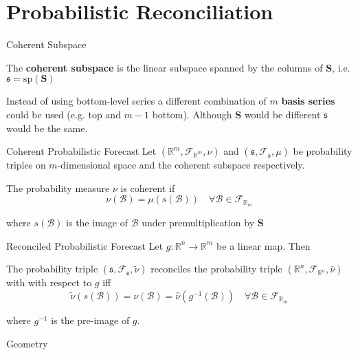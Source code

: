 \documentclass{beamer}
\begin{document}
  \section{Probabilistic Reconciliation}
  \begin{frame}{Coherent Subspace}
  	\begin{definition} 
  		The {\bf coherent subspace} is the linear subspace spanned by the columns of ${\bm S}$, i.e. $\mathfrak{s}=\mbox{sp}({\bm S})$
  	\end{definition}
    Instead of using bottom-level series a different combination of $m$ {\bf basis series} could be used (e.g. top and $m-1$ bottom).  Although ${\bm S}$ would be different $\mathfrak{s}$ would be the same.
  \end{frame}
  \begin{frame}{Coherent Probabilistic Forecast}
    Let $(\mathbb{R}^m,\mathcal{F}_{\mathbb{R}^m},\nu)$ and $(\mathfrak{s},\mathcal{F}_{\mathfrak{s}},\mu)$ be probability triples on $m$-dimensional space and the coherent subspace respectively.
    \begin{definition}
      The probability measure $\nu$ is coherent if
      \begin{equation*}
      \nu(\mathcal{B})=\mu(s(\mathcal{B}))\quad\forall\mathcal{B}\in \mathcal{F}_{\mathbb{R}_m}
      \end{equation*} 
    \end{definition}
    where $s(\mathcal{B})$ is the image of $\mathcal{B}$ under premultiplication by ${\bm S}$
  \end{frame}
  \begin{frame}{Reconciled Probabilistic Forecast}
  	Let $g:\mathbb{R}^n\rightarrow\mathbb{R}^m$ be a linear map.  Then 
  	\begin{definition}
  	The probability triple $\left(\mathfrak{s},\mathcal{F}_{\mathfrak{s}},\tilde{\nu}\right)$ reconciles the probability triple $\left(\mathbb{R}^n,\mathcal{F}_{\mathbb{R}^n},\hat{\nu}\right)$ with with respect to $g$ iff
  	\begin{equation*}
  	\tilde{\nu}(s(\mathcal{B}))=\nu(\mathcal{B})=\hat{\nu}(g^{-1}(\mathcal{B}))\quad\forall \mathcal{B}\in\mathcal{F}_{\mathbb{R}_m}
  	\end{equation*}
  	\end{definition}
    where $g^{-1}$ is the pre-image of $g$.
  \end{frame}
  \begin{frame}{Geometry}
  	\centering
  	
  \end{frame}
\end{document}
